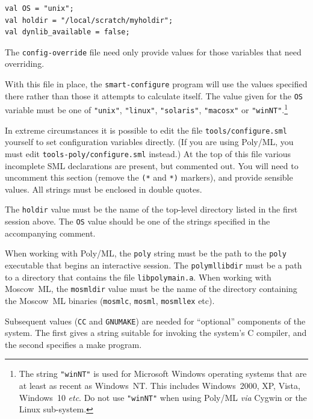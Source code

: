 \begin{session}
\begin{verbatim}
val OS = "unix";
val holdir = "/local/scratch/myholdir";
val dynlib_available = false;
\end{verbatim}
\end{session}

The \texttt{config-override} file need only provide values for those
variables that need overriding.

With this file in place, the \texttt{smart-configure} program will use
the values specified there rather than those it attempts to calculate
itself.  The value given for the \texttt{OS} variable must be one of
\texttt{"unix"}, \texttt{"linux"}, \texttt{"solaris"},
\texttt{"macosx"} or \texttt{"winNT"}.\footnote{%
The string \texttt{"winNT"} is used for Microsoft Windows operating systems that are at least as recent as Windows~NT.
This includes Windows~2000, XP, Vista, Windows~10 \textit{etc}.
Do not use \texttt{"winNT"} when using Poly/ML \textit{via} Cygwin or the Linux sub-system.}

In extreme circumstances it is possible to edit the file
\texttt{tools/configure.sml} yourself to set configuration variables
directly.  (If you are using Poly/ML, you must edit
\texttt{tools-poly/configure.sml} instead.) At the top of this file
various incomplete SML declarations are present, but commented out.
You will need to uncomment this section (remove the \texttt{(*} and
\texttt{*)} markers), and provide sensible values.  All strings must
be enclosed in double quotes.

The \texttt{holdir} value must be the name of the top-level directory
listed in the first session above.  The \texttt{OS} value should be
one of the strings specified in the accompanying comment.

When working with Poly/ML, the \texttt{poly} string must be the path to the \texttt{poly} executable that begins an interactive \ML{} session.
The \texttt{polymllibdir} must be a path to a directory that contains the file \texttt{libpolymain.a}.
When working with Moscow~ML, the \texttt{mosmldir} value must be the
name of the directory containing the Moscow~ML binaries
(\texttt{mosmlc}, \texttt{mosml}, \texttt{mosmllex} etc).

Subsequent values (\texttt{CC} and \texttt{GNUMAKE}) are needed for
``optional'' components of the system.  The first gives a string
suitable for invoking the system's C compiler, and the second
specifies a \textsf{make} program.

